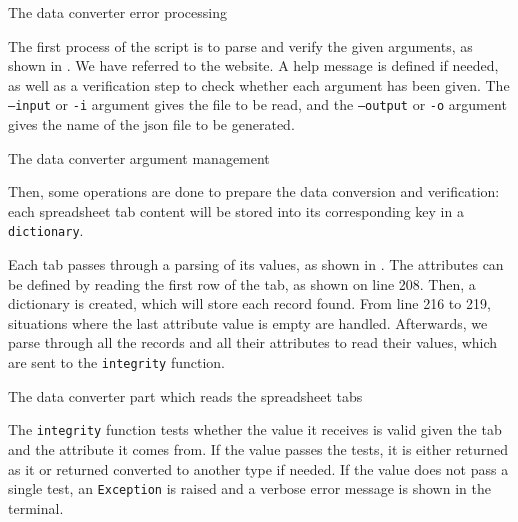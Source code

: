 \begin{listing}[!ht] 
\caption{The data converter error processing}
\label{lst:app_converter_catch}
\end{listing}

The first process of the script is to parse and verify the given arguments, as shown in . We have referred to the  website. A help message is defined if needed, as well as a verification step to check whether each argument has been given. The \texttt{--input} or \texttt{-i} argument gives the  file to be read, and the \texttt{--output} or \texttt{-o} argument gives the name of the \gls{json} file to be generated.

\begin{listing}[!ht] 
\caption{The data converter argument management}
\label{lst:app_converter_arguments}
\end{listing}

Then, some operations are done to prepare the data conversion and verification: each spreadsheet tab content will be stored into its corresponding key in a  \texttt{dictionary}.

Each tab passes through a parsing of its values, as shown in . The attributes can be defined by reading the first row of the tab, as shown on line 208. Then, a dictionary is created, which will store each record found. From line 216 to 219, situations where the last attribute value is empty are handled. Afterwards, we parse through all the records and all their attributes to read their values, which are sent to the \texttt{integrity} function.

\begin{listing}[!ht] 
\caption{The data converter part which reads the spreadsheet tabs}
\label{lst:app_converter_readsheet}
\end{listing}

The \texttt{integrity} function tests whether the value it receives is valid given the tab and the attribute it comes from. If the value passes the tests, it is either returned as it or returned converted to another type if needed. If the value does not pass a single test, an \texttt{Exception} is raised and a verbose error message is shown in the terminal.

